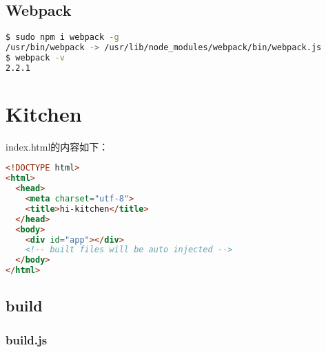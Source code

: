 \begin{lstlisting}[language=bash]

\end{lstlisting}


\begin{lstlisting}[language=bash]

\end{lstlisting}


\begin{lstlisting}[language=bash]

\end{lstlisting}

\section{Webpack}


\begin{lstlisting}[language=bash]
$ sudo npm i webpack -g
/usr/bin/webpack -> /usr/lib/node_modules/webpack/bin/webpack.js
$ webpack -v
2.2.1
\end{lstlisting}

\chapter{Kitchen}

index.html的内容如下：


\begin{lstlisting}[language=HTML]
<!DOCTYPE html>
<html>
  <head>
    <meta charset="utf-8">
    <title>hi-kitchen</title>
  </head>
  <body>
    <div id="app"></div>
    <!-- built files will be auto injected -->
  </body>
</html>
\end{lstlisting}


\section{build}


\subsection{build.js}


